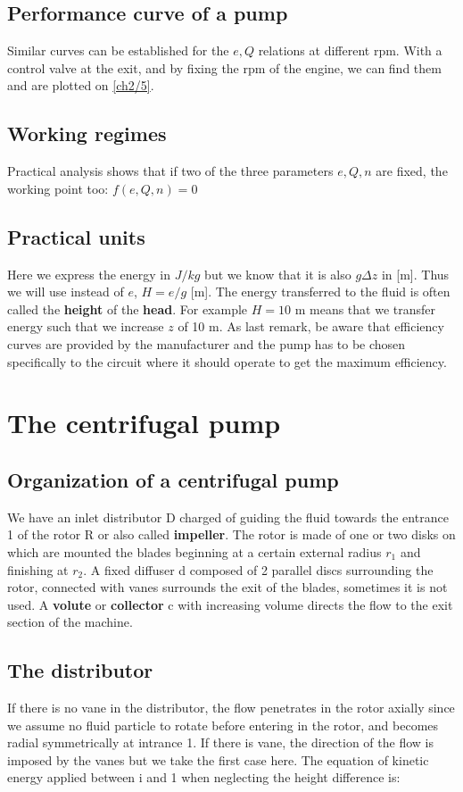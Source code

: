 \subsection{Performance curve of a pump}
Similar curves can be established for the $e, Q$ relations at different rpm. With a control valve at the exit, and by fixing the rpm of the engine, we can find them and are plotted on \autoref{ch2/5}. 

\subsection{Working regimes}
Practical analysis shows that if two of the three parameters $e,Q,n$ are fixed, the working point too: $f(e,Q,n) = 0$

\subsection{Practical units}
Here we express the energy in $J/kg$ but we know that it is also $g\Delta z$ in [m]. Thus we will use instead of $e$, $H = e/g$ [m]. The energy transferred to the fluid is often called the \textbf{height} of the \textbf{head}. For example $H = 10$ m means that we transfer energy such that we increase $z$ of 10 m. As last remark, be aware that efficiency curves are provided by the manufacturer and the pump has to be chosen specifically to the circuit where it should operate to get the maximum efficiency. 

\section{The centrifugal pump}
\subsection{Organization of a centrifugal pump}
We have an inlet distributor D charged of guiding the fluid towards the entrance 1 of the rotor R or also called \textbf{impeller}. The rotor is made of one or two disks on which are mounted the blades beginning at a certain external radius $r_1$ and finishing at $r_2$. A fixed diffuser d composed of 2 parallel discs surrounding the rotor, connected with vanes surrounds the exit of the blades, sometimes it is not used. A \textbf{volute} or \textbf{collector} c with increasing volume directs the flow to the exit section of the machine. 

\subsection{The distributor}
If there is no vane in the distributor, the flow penetrates in the rotor axially since we assume no fluid particle to rotate before entering in the rotor, and becomes radial symmetrically at intrance 1. If there is vane, the direction of the flow is imposed by the vanes but we take the first case here. The equation of kinetic energy applied between i and 1 when neglecting the height difference is: 

